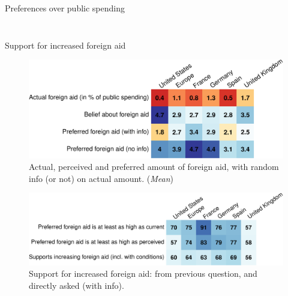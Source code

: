 \documentclass[aspectratio=169,xcolor=dvipsnames, 11pt,mathserif]{beamer}
\begin{document}
\begin{frame}{Preferences over public spending%
	\hyperlink{other_policies}{}}
\begin{columns}
\begin{column}{0.5\textwidth}
\begin{figure}
            \end{figure}
        \end{column}
    \end{columns}
	\bbvs \ip {}
	\ee 
\end{frame} 

\begin{frame}{Support for increased foreign aid \hyperlink{other_policies}{}\label{foreign_aid_perceptions}}\vspace{-.2cm} 
    \begin{figure} 
        \centering 
        \caption{Actual, perceived and preferred amount of foreign aid, with random info (or not) on actual amount. (\textit{Mean})}\vspace{-.2cm}
        \includegraphics[height=.4\textheight]{../figures/country_comparison/foreign_aid_amount_mean.pdf} %
    \end{figure}\vspace{-.2cm}\pause
    \begin{figure} 
        \centering 
        \caption{Support for increased foreign aid: from previous question, and directly asked (with info).}\vspace{-.2cm}
        \includegraphics[height=.32\textheight]{../figures/country_comparison/foreign_aid_no_less_positive.pdf} 
    \end{figure} \vspace{-.1cm}
	\quad \quad \quad \quad \quad \quad {} \quad \quad \quad {}
\end{frame}
\end{document}
